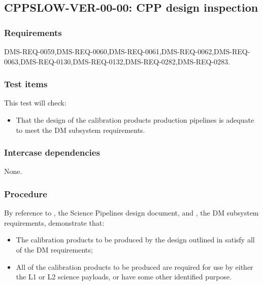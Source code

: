 \subsection{CPPSLOW-VER-00-00: CPP design inspection}
\label{cppslow-ver-00-00}

\subsubsection{Requirements}

DMS-REQ-0059,DMS-REQ-0060,DMS-REQ-0061,DMS-REQ-0062,DMS-REQ-0063,DMS-REQ-0130,DMS-REQ-0132,DMS-REQ-0282,DMS-REQ-0283.

\subsubsection{Test items}

This test will check:

\begin{itemize}

  \item{That the design of the calibration products production pipelines is
  adequate to meet the DM subsystem requirements.}

\end{itemize}

\subsubsection{Intercase dependencies}

None.

\subsubsection{Procedure}

By reference to , the Science Pipelines design document, and
, the DM subsystem requirements, demonstrate that:

\begin{itemize}

  \item{The calibration products to be produced by the design outlined in
   satisfy all of the DM requirements;}
  \item{All of the calibration products to be produced are required for use by
  either the L1 or L2 science payloads, or have some other identified
  purpose.}

\end{itemize}

